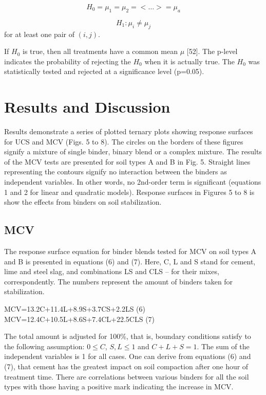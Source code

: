 \documentclass[electronics,article,submit,pdftex,moreauthors]{Definitions/mdpi}
\begin{document}
\begin{equation}
H_0 = \mu _1 = \mu _2 = <\ldots> = \mu _a
\end{equation}

\begin{equation}
H_1: \mu _i \neq \mu _j
\end{equation}
for at least one pair of $(i, j)$.

If $H_0$ is true, then all treatments have a common mean $\mu$ [52]. The p-level indicates the probability of rejecting the $H_0$ when it is actually true. The $H_0$ was statistically tested and rejected at a significance level (p=0.05). 

\section{Results and Discussion}
Results demonstrate a series of plotted ternary plots showing response surfaces for UCS and MCV (Figs. 5 to 8). The circles on the borders of these figures signify a mixture of single binder, binary blend or a complex mixture. The results of the MCV tests are presented for soil types A and B in Fig. 5. Straight lines representing the contours signify no interaction between the binders as independent variables. In other words, no 2nd-order term is significant (equations 1 and 2 for linear and quadratic models). Response surfaces in Figures 5 to 8 is show the effects from binders on soil stabilization. 

\subsection{MCV}
The response surface equation for binder blends tested for MCV on soil types A and B is presented in equations (6) and (7). Here, C, L and S stand for cement, lime and steel slag, and combinations LS and CLS – for their mixes, correspondently. The numbers represent the amount of binders taken for stabilization.

MCV=13.2C+11.4L+8.9S+3.7CS+2.2LS 		(6) 
MCV=12.4C+10.5L+8.6S+7.4CL+22.5CLS	 (7)

The total amount is adjusted for 100\%, that is, boundary conditions satisfy to the following assumption:  $0 \le C$, $S, L \le 1$ and $C+L+S = 1$. The sum of the independent variables is 1 for all cases. One can derive from equations (6) and (7), that cement has the greatest impact on soil compaction after one hour of treatment time. There are correlations between various binders for all the soil types with those having a positive mark indicating the increase in MCV.
\end{document}
